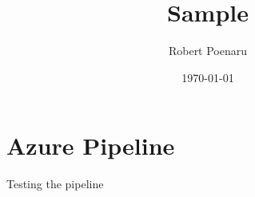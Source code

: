 \documentclass[12pt, letterpaper, twoside]{article}
\title{Sample}
\author{Robert Poenaru}
\date{\today}
\begin{document}
\maketitle


\section{Azure Pipeline}

Testing the pipeline
\end{document}

